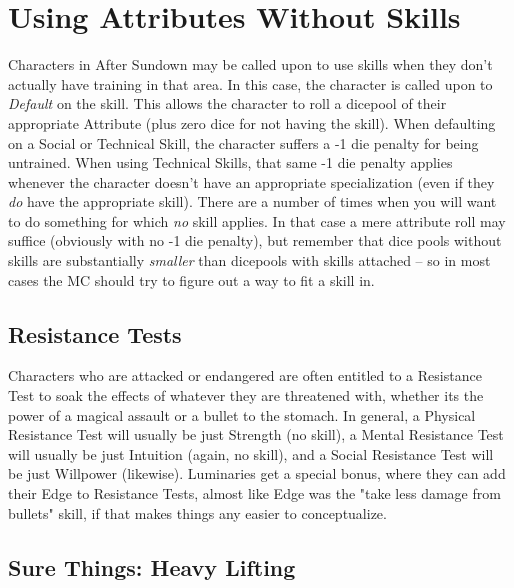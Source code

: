 \section{Using Attributes Without Skills}

Characters in After Sundown may be called upon to use skills when they don't actually have training in that area. In this case, the character is called upon to \textit{Default} on the skill. This allows the character to roll a dicepool of their appropriate Attribute (plus zero dice for not having the skill). When defaulting on a Social or Technical Skill, the character suffers a -1 die penalty for being untrained. When using Technical Skills, that same -1 die penalty applies whenever the character doesn't have an appropriate specialization (even if they \textit{do} have the appropriate skill). There are a number of times when you will want to do something for which \textit{no} skill applies. In that case a mere attribute roll may suffice (obviously with no -1 die penalty), but remember that dice pools without skills are substantially \textit{smaller} than dicepools with skills attached -- so in most cases the MC should try to figure out a way to fit a skill in.

\subsection{Resistance Tests} 

Characters who are attacked or endangered are often entitled to a Resistance Test to soak the effects of whatever they are threatened with, whether its the power of a magical assault or a bullet to the stomach. In general, a Physical Resistance Test will usually be just Strength (no skill), a Mental Resistance Test will usually be just Intuition (again, no skill), and a Social Resistance Test will be just Willpower (likewise). Luminaries get a special bonus, where they can add their Edge to Resistance Tests, almost like Edge was the "take less damage from bullets" skill, if that makes things any easier to conceptualize.

\subsection{Sure Things: Heavy Lifting} 

